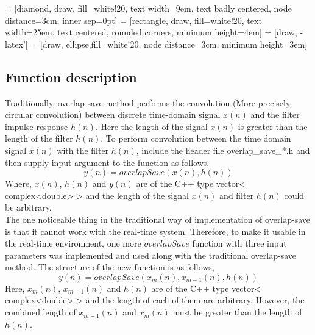 %


 = [diamond, draw, fill=white!20, 
text width=9em, text badly centered, node distance=3cm, inner sep=0pt]
 = [rectangle, draw, fill=white!20,
text width=25em, text centered, rounded corners, minimum height=4em]
 = [draw, -latex']
 = [draw, ellipse,fill=white!20, node distance=3cm,
minimum height=3em]

\newpage
\subsection*{Function description}
Traditionally, overlap-save method performs the convolution (More precisely, circular convolution) between discrete time-domain signal $x(n)$ and the filter impulse response $h(n)$. Here the length of the signal $x(n)$ is greater than the length of the filter $h(n)$.
To perform convolution between the time domain signal $x(n)$ with the filter $h(n)$, include the header file overlap\_save\_*.h and then supply input argument to the function as follows,
 \begin{equation*}
 y(n) = overlapSave(x(n),h(n))
 \end{equation*}
Where, $x(n)$, $h(n)$ and $y(n)$ are of the C++ type vector< complex<double> > and the length of the signal $x(n)$ and filter  $h(n)$ could be arbitrary.\\
The one noticeable thing in the traditional way of implementation of overlap-save is that it cannot work with the real-time system. Therefore, to make it usable in the real-time environment, one more $overlapSave$ function with three input parameters was implemented and used along with the traditional overlap-save method. The structure of the new function is as follows,
 \begin{equation*}
y(n) =overlapSave(x_{m}(n), x_{m-1}(n), h(n))
\end{equation*}
Here, $x_{m}(n)$, $x_{m-1}(n)$ and $h(n)$ are of the C++ type vector< complex<double> > and the length of each of them are arbitrary. However, the combined length of $x_{m-1}(n)$ and $x_{m}(n)$ must be greater than the length of $h(n)$.
